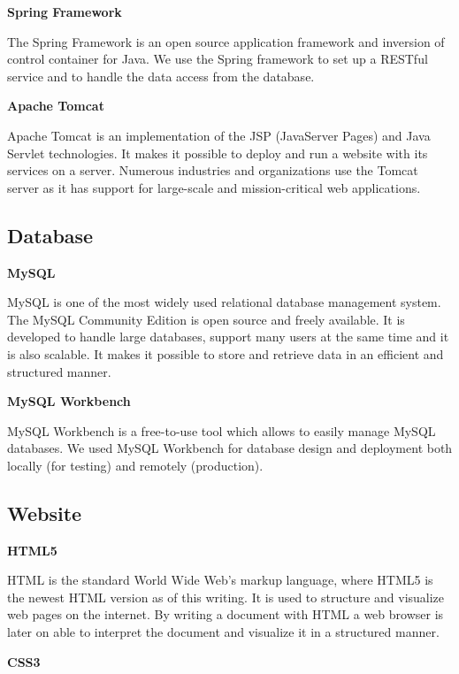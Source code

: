 \textbf{Spring Framework}

The Spring Framework is an open source application framework and inversion of control container for Java. 
We use the Spring framework to set up a RESTful service and to handle the data access from the database. \cite{SpringFramework1}\cite{SpringFramework2}

\textbf{Apache Tomcat}

Apache Tomcat is an implementation of the JSP (JavaServer Pages) and Java Servlet technologies.
It makes it possible to deploy and run a website with its services on a server.
Numerous industries and organizations use the Tomcat server as it has support for large-scale and mission-critical web applications. \cite{ApacheTomcat}

\subsection{Database}

\textbf{MySQL}

MySQL is one of the most widely used relational database management system.
The MySQL Community Edition is open source and freely available.
It is developed to handle large databases, support many users at the same time and it is also scalable.
It makes it possible to store and retrieve data in an efficient and structured manner. \cite{MySQL}

\textbf{MySQL Workbench}

MySQL Workbench is a free-to-use tool which allows to easily manage MySQL databases.
We used MySQL Workbench for database design and deployment both locally (for testing) and remotely (production).


\subsection{Website}

\textbf{HTML5}

HTML is the standard World Wide Web's markup language, where HTML5 is the newest HTML version as of this writing.
It is used to structure and visualize web pages on the internet.
By writing a document with HTML a web browser is later on able to interpret the document and visualize it in a structured manner. \cite{HTML5}

\textbf{CSS3}

